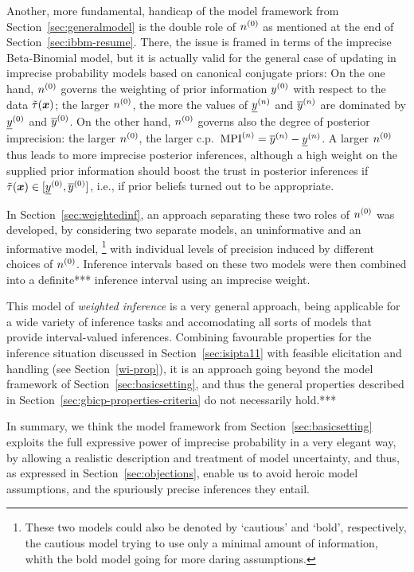 Another, more fundamental, handicap of the model framework from Section~\ref{sec:generalmodel}
is the double role of $n^{(0)}$ as mentioned at the end of Section~\ref{sec:ibbm-resume}.
There, the issue is framed in terms of the imprecise Beta-Binomial model,
but it is actually valid for the general case of updating
in imprecise probability models based on canonical conjugate priors:
On the one hand, $n^{(0)}$ governs the weighting of prior information $y^{(0)}$ with
respect to the data $\tilde{\tau}({\bm x})$;
the larger $n^{(0)}$, the more the values of $\underline{y}^{(n)}$ and $\overline{y}^{(n)}$ are dominated by $\underline{y}^{(0)}$ and $\overline{y}^{(0)}$.
On the other hand, $n^{(0)}$ governs also the degree of posterior imprecision:
the larger $n^{(0)}$, the larger c.p.\ ${\rm MPI}^{(n)} = \overline{y}^{(n)} - \underline{y}^{(n)}$.
A larger $n^{(0)}$ thus leads to more imprecise posterior inferences,
although a high weight on the supplied prior information
should boost the trust in posterior inferences if $\tilde{\tau}({\bm x}) \in [\underline{y}^{(0)}, \overline{y}^{(0)}]$,
i.e., if prior beliefs turned out to be appropriate.

In Section~\ref{sec:weightedinf},
an approach separating these two roles of $n^{(0)}$ was developed,
by considering two separate models,
an uninformative and an informative model,%
\footnote{These two models could also be denoted by `cautious' and `bold', respectively,
the cautious model trying to use only a minimal amount of information, %
whith the bold model going for more daring assumptions.}
with individual levels of precision induced by different choices of $n^{(0)}$. 
Inference intervals based on these two models were then combined into a definite*** inference interval
using an imprecise weight.

This model of \emph{weighted inference} is a very general approach,
being applicable for a wide variety of inference tasks and accomodating all sorts of models that provide interval-valued inferences.
Combining favourable properties 
for the inference situation discussed in Section~\ref{sec:isipta11}
with feasible elicitation and handling (see Section~\ref{wi-prop}),
it is an approach going beyond the model framework of Section~\ref{sec:basicsetting},
and thus the general properties described in Section~\ref{sec:gbicp-properties-criteria}
do not necessarily hold.***

\medskip

In summary, we think the model framework from Section~\ref{sec:basicsetting}
exploits the full expressive power of imprecise probability %
in a very elegant way, by allowing a realistic description and treatment
of model uncertainty, and thus, as expressed in Section~\ref{sec:objections},
enable us to avoid heroic model assumptions, and the spuriously precise inferences they entail. 

